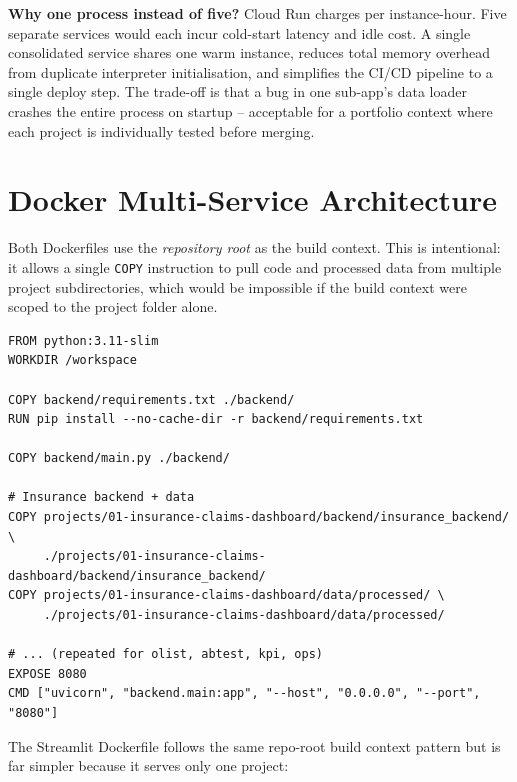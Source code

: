 \begin{decisionbox}
\textbf{Why one process instead of five?} Cloud Run charges per instance-hour. Five separate services would each incur cold-start latency and idle cost. A single consolidated service shares one warm instance, reduces total memory overhead from duplicate interpreter initialisation, and simplifies the CI/CD pipeline to a single deploy step. The trade-off is that a bug in one sub-app's data loader crashes the entire process on startup -- acceptable for a portfolio context where each project is individually tested before merging.
\end{decisionbox}

\section{Docker Multi-Service Architecture}
\label{sec:infra-docker}


Both Dockerfiles use the \emph{repository root} as the build context. This is intentional: it allows a single \texttt{COPY} instruction to pull code and processed data from multiple project subdirectories, which would be impossible if the build context were scoped to the project folder alone.

\begin{lstlisting}[style=dockerfile, caption={Consolidated API Dockerfile -- backend/Dockerfile}]
FROM python:3.11-slim
WORKDIR /workspace

COPY backend/requirements.txt ./backend/
RUN pip install --no-cache-dir -r backend/requirements.txt

COPY backend/main.py ./backend/

# Insurance backend + data
COPY projects/01-insurance-claims-dashboard/backend/insurance_backend/ \
     ./projects/01-insurance-claims-dashboard/backend/insurance_backend/
COPY projects/01-insurance-claims-dashboard/data/processed/ \
     ./projects/01-insurance-claims-dashboard/data/processed/

# ... (repeated for olist, abtest, kpi, ops)
EXPOSE 8080
CMD ["uvicorn", "backend.main:app", "--host", "0.0.0.0", "--port", "8080"]
\end{lstlisting}

The Streamlit Dockerfile follows the same repo-root build context pattern but is far simpler because it serves only one project:

